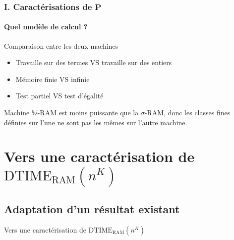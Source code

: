 \documentclass[10pt]{beamer}
\newcommand{\bbW}{\mathbb{W}}
\newcommand{\dtimeram}{\text{DTIME}_{\text{RAM}}\left( n^K \right)}
\begin{document}
	
	\begin{frame}
		\frametitle{I. Caractérisations de $\textbf{P}$}
		\framesubtitle{Quel modèle de calcul ?}
		
		\begin{block}{Comparaison entre les deux machines}
			\begin{itemize}
				\item 	Travaille sur des termes VS travaille sur des entiers
				\item 	Mémoire finie VS infinie
				\item 	Test partiel VS test d'égalité
			\end{itemize}
			
			
			Machine $\bbW$-RAM est moins puissante que la $\sigma$-RAM, donc les classes fines définies sur l'une ne sont pas les mêmes sur l'autre machine.
			
		\end{block}
	\end{frame}
	
	
	
	
	
	\section{Vers une caractérisation de $\dtimeram$}
	\subsection{Adaptation d'un résultat existant}
			
	
	\begin{frame}
		\begin{center}
			Vers une caractérisation de $\dtimeram$
		\end{center}
	\end{frame}
	
\end{document}
